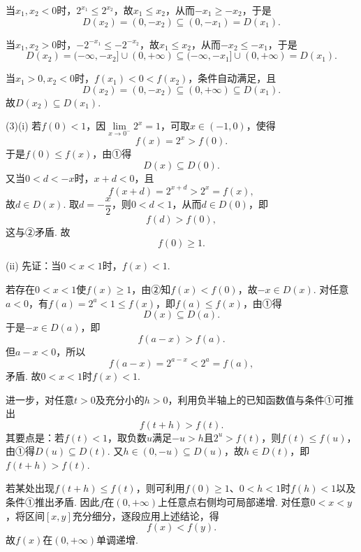 \documentclass[12pt,a4paper]{article}
\begin{document}
\begin{enumerate}[leftmargin=*,label=\arabic*.,resume,itemsep=1.2ex]
		当$x_1,x_2<0$时，$2^{x_1}\le2^{x_2}$，故$x_1\le x_2$，从而$-x_1\ge -x_2$，于是
		\[
		D(x_2)=(0,-x_2)\subseteq(0,-x_1)=D(x_1).
		\]
		
		当$x_1,x_2>0$时，$-2^{-x_1}\le-2^{-x_2}$，故$x_1\le x_2$，从而$-x_2\le -x_1$，于是
		\[
		D(x_2)=(-\infty,-x_2]\cup(0,+\infty)
		\subseteq(-\infty,-x_1]\cup(0,+\infty)=D(x_1).
		\]
		
		当$x_1>0,x_2<0$时，$f(x_1)<0<f(x_2)$，条件自动满足，且
		\[
		D(x_2)=(0,-x_2)\subseteq(0,+\infty)\subseteq D(x_1).
		\]
		故$D(x_2)\subseteq D(x_1)$.
		
		(3)(i) 若$f(0)<1$，因$\lim\limits_{x\to0^-}2^x=1$，可取$x\in(-1,0)$，使得
		\[
		f(x)=2^x>f(0).
		\]
		于是$f(0)\le f(x)$，由①得
		\[
		D(x)\subseteq D(0).
		\]
		又当$0<d<-x$时，$x+d<0$，且
		\[
		f(x+d)=2^{x+d}>2^x=f(x),
		\]
		故$d\in D(x)$. 取$d=-\dfrac x2$，则$0<d<1$，从而$d\in D(0)$，即
		\[
		f(d)>f(0),
		\]
		这与②矛盾. 故
		\[
		\boxed{f(0)\ge1}.
		\]
		
		(ii) 先证：当$0<x<1$时，$f(x)<1$.
		
		若存在$0<x<1$使$f(x)\ge1$，由②知$f(x)<f(0)$，故$-x\in D(x)$. 对任意$a<0$，有$f(a)=2^a<1\le f(x)$，即$f(a)\le f(x)$，由①得
		\[
		D(x)\subseteq D(a).
		\]
		于是$-x\in D(a)$，即
		\[
		f(a-x)>f(a).
		\]
		但$a-x<0$，所以
		\[
		f(a-x)=2^{a-x}<2^a=f(a),
		\]
		矛盾. 故$0<x<1$时$f(x)<1$.
		
		进一步，对任意$t>0$及充分小的$h>0$，利用负半轴上的已知函数值与条件①可推出
		\[
		f(t+h)>f(t).
		\]
		其要点是：若$f(t)<1$，取负数$u$满足$-u>h$且$2^u>f(t)$，则$f(t)\le f(u)$，由①得$D(u)\subseteq D(t)$. 又$h\in(0,-u)\subseteq D(u)$，故$h\in D(t)$，即$f(t+h)>f(t)$.
		
		若某处出现$f(t+h)\le f(t)$，则可利用$f(0)\ge1$、$0<h<1$时$f(h)<1$以及条件①推出矛盾. 因此$f$在$(0,+\infty)$上任意点右侧均可局部递增. 对任意$0<x<y$，将区间$[x,y]$充分细分，逐段应用上述结论，得
		\[
		f(x)<f(y).
		\]
		故$f(x)$在$(0,+\infty)$单调递增.
		
	\end{enumerate}
	
\end{document}
